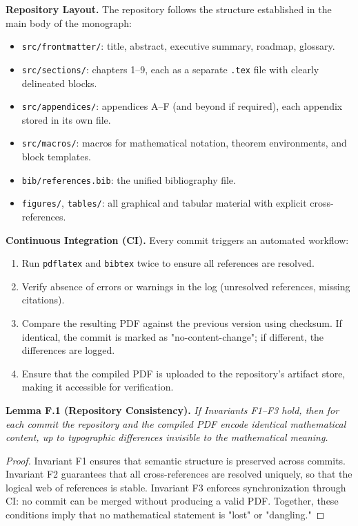 \medskip
\noindent \textbf{Repository Layout.} The repository follows the structure established in the main body of the monograph:
\begin{itemize}
  \item \texttt{src/frontmatter/}: title, abstract, executive summary, roadmap, glossary.
  \item \texttt{src/sections/}: chapters 1--9, each as a separate \texttt{.tex} file with clearly delineated blocks.
  \item \texttt{src/appendices/}: appendices A--F (and beyond if required), each appendix stored in its own file.
  \item \texttt{src/macros/}: macros for mathematical notation, theorem environments, and block templates.
  \item \texttt{bib/references.bib}: the unified bibliography file.
  \item \texttt{figures/}, \texttt{tables/}: all graphical and tabular material with explicit cross-references.
\end{itemize}

\medskip
\noindent \textbf{Continuous Integration (CI).}  
Every commit triggers an automated workflow:
\begin{enumerate}
  \item Run \texttt{pdflatex} and \texttt{bibtex} twice to ensure all references are resolved.
  \item Verify absence of errors or warnings in the log (unresolved references, missing citations).
  \item Compare the resulting PDF against the previous version using checksum. If identical, the commit is marked as "no-content-change"; if different, the differences are logged.
  \item Ensure that the compiled PDF is uploaded to the repository’s artifact store, making it accessible for verification.
\end{enumerate}

\medskip
\noindent \textbf{Lemma F.1 (Repository Consistency).}  
\emph{If Invariants F1--F3 hold, then for each commit the repository and the compiled PDF encode identical mathematical content, up to typographic differences invisible to the mathematical meaning.}  

\begin{proof}  
Invariant F1 ensures that semantic structure is preserved across commits. Invariant F2 guarantees that all cross-references are resolved uniquely, so that the logical web of references is stable. Invariant F3 enforces synchronization through CI: no commit can be merged without producing a valid PDF. Together, these conditions imply that no mathematical statement is "lost" or "dangling."  
\end{proof}

